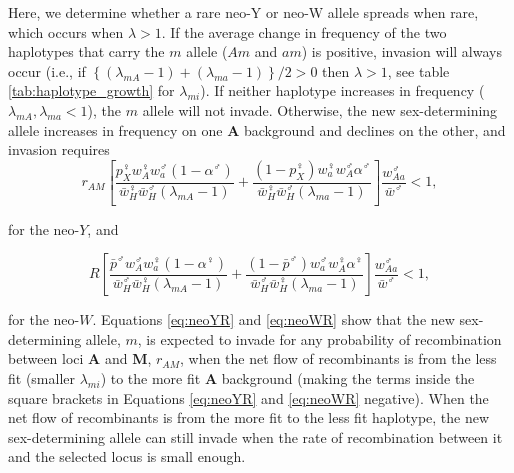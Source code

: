 \documentclass[12pt]{article}
\begin{document}
Here, we determine whether a rare neo-Y or neo-W allele spreads when rare, which occurs when $\lambda > 1$. 
If the average change in frequency of the two haplotypes that carry the $m$ allele ($Am$ and $am$) is positive, invasion will always occur (i.e., if $\left\{(\lambda_{mA}-1)+ (\lambda_{ma}-1) \right\}/2 > 0$ then $\lambda > 1$, see table \ref{tab:haplotype_growth} for $\lambda_{mi}$). 
If neither haplotype increases in frequency ($\lambda_{mA}, \lambda_{ma} < 1$), the $m$ allele will not invade. 
Otherwise, the new sex-determining allele increases in frequency on one \textbf{A} background and declines on the other, and invasion requires
\begin{equation}\label{eq:neoYR}
r_{AM} \left[ 
\frac{p^\female_X w^\female_A w^\male_a (1-\alpha^\male)}{ \bar{w}^\female_H \bar{w}^\male_H (\lambda_{mA}-1)} + 
\frac{(1 - p^\female_X) w^\female_a w^\male_A \alpha^\male}{ \bar{w}^\female_H \bar{w}^\male_H (\lambda_{ma}-1)} 
\right] 
\frac{w^\male_{Aa}}{\bar{w}^\male} < 1,
\end{equation}

\noindent
for the neo-$Y$, and 

\noindent
\begin{equation}\label{eq:neoWR}
R \left[ 
\frac{\bar{p}^\male w^\male_A w^\female_a (1-\alpha^\female)}{ \bar{w}^\male_H \bar{w}^\female_H (\lambda_{mA}-1)} + 
\frac{(1 - \bar{p}^\male) w^\male_a w^\female_A \alpha^\female}{ \bar{w}^\male_H \bar{w}^\female_H (\lambda_{ma}-1)} 
\right] 
\frac{w^\male_{Aa}}{\bar{w}^\male} < 1,
\end{equation}

\noindent
for the neo-$W$. Equations \eqref{eq:neoYR} and \eqref{eq:neoWR} show that the new sex-determining allele, $m$, is expected to invade for any probability of recombination between loci \textbf{A} and \textbf{M}, $r_{AM}$, when the net flow of recombinants is from the less fit (smaller $\lambda_{mi}$) to the more fit \textbf{A} background (making the terms inside the square brackets in Equations \ref{eq:neoYR} and \ref{eq:neoWR} negative). %
When the net flow of recombinants is from the more fit to the less fit haplotype, the new sex-determining allele can still invade when the rate of recombination between it and the selected locus is small enough. %


\newpage

\end{document}
